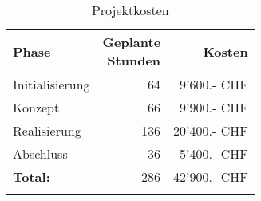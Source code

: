 \begin{longtable}[]{@{}lrr@{}}
  \toprule
  \textbf{Phase}  & \makecell[r]{\textbf{Geplante}                               \\\textbf{Stunden}} & \textbf{Kosten}\tabularnewline
  \midrule
  \endhead
  Initialisierung & 64                             & 9'600.- CHF\tabularnewline
  Konzept         & 66                             & 9'900.- CHF\tabularnewline
  Realisierung    & 136                            & 20'400.- CHF\tabularnewline
  Abschluss       & 36                             & 5'400.- CHF\tabularnewline
  \midrule
  \textbf{Total:} & 286                            & 42'900.- CHF\tabularnewline
  \bottomrule
  \caption{Projektkosten}
\end{longtable}
